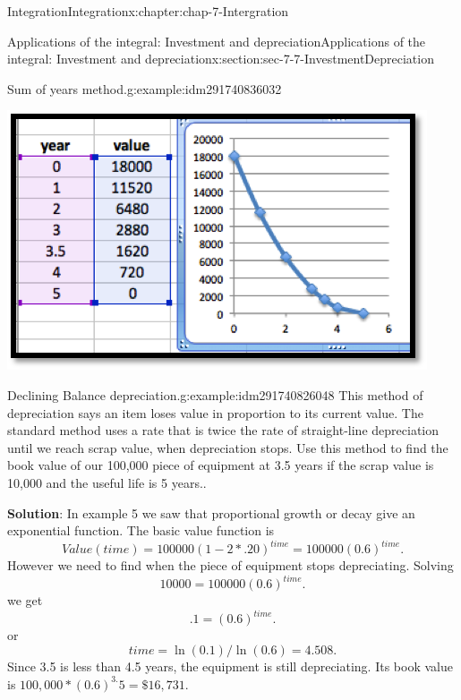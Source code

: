 \documentclass[oneside,10pt,]{book}
\newcommand{\terminology}[1]{\textbf{#1}}
\numberwithin{equation}{section}
\begin{document}
\begin{chapterptx}{Integration}{}{Integration}{}{}{x:chapter:chap-7-Intergration}
\begin{sectionptx}{Applications of the integral: Investment and depreciation}{}{Applications of the integral: Investment and depreciation}{}{}{x:section:sec-7-7-InvestmentDepreciation}
\begin{example}{Sum of years method.}{g:example:idm291740836032}
\begin{sidebyside}{1}{0.25}{0.25}{0}
\begin{sbspanel}{0.5}%
\includegraphics[width=\linewidth]{images/sec7-7-7.png}
\end{sbspanel}%
\end{sidebyside}%
\end{example}
\begin{example}{Declining Balance depreciation.}{g:example:idm291740826048}%
This method of depreciation says an item loses value in proportion to its current value.  The standard method uses a rate that is twice the rate of straight-line depreciation until we reach scrap value, when depreciation stops.  Use this method to find the book value of our \textdollar{}100,000 piece of equipment at 3.5 years if the scrap value is \textdollar{}10,000 and the useful life is 5 years..%
\par
\terminology{Solution}: In example 5 we saw that proportional growth or decay give an exponential function.  The basic value function is%
%
\begin{equation*}
Value(time)=100000(1-2*.20)^{time}=100000(0.6)^{time}.
\end{equation*}
However we need to find when the piece of equipment stops depreciating.  Solving%
%
\begin{equation*}
10000=100000(0.6)^{time}.
\end{equation*}
we get%
%
\begin{equation*}
.1=(0.6)^{time}.
\end{equation*}
or%
%
\begin{equation*}
time=\ln (0.1)/\ln (0.6) =4.508.
\end{equation*}
Since 3.5 is less than 4.5 years, the equipment is still depreciating.  Its book value is \(100,000*(0.6)^{3.}5 = \$16,731\).%
\begin{sidebyside}{1}{0.2}{0.2}{0}%

\end{sidebyside}
\end{example}
\end{sectionptx}
\end{chapterptx}
\end{document}
